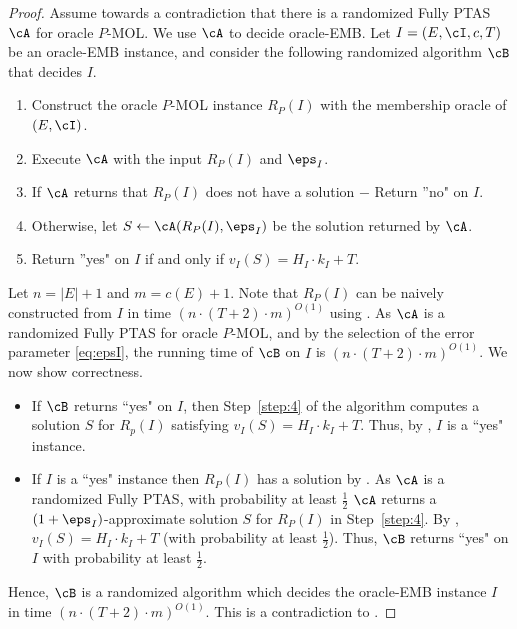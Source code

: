 \begin{proof}
	Assume towards a contradiction that there is a randomized Fully PTAS $\cA$ for oracle $P$-MOL. We use $\cA$ to decide oracle-EMB. Let $I = (E,\cI,c,T)$  be an oracle-EMB instance, and %
	consider the following randomized algorithm $\cB$ that decides $I$. 
	\begin{enumerate}
		\item Construct the oracle $P$-MOL instance $R_{P}(I)$
		with the membership oracle of $(E,\cI)$.\label{step:1} 
		\item 
		Execute $\cA$ with the input $R_{P}(I)$ and $\eps_I$. \label{step:2} 
		\item If $\cA$ returns that $R_{P}(I)$ does not have a solution $-$ Return ''no" on $I$. \label{step:3}  %
		\item Otherwise, let $S \leftarrow \cA(R_{P}(I),\eps_I)$ be the solution returned  by $\cA$.\label{step:4} 
		\item Return ''yes" on $I$ if and only if $v_I(S) = H_I \cdot k_I+T$. \label{step:5} 
	\end{enumerate}
	
	Let $n = |E|+1$ and $m = c(E)+1$. Note that $R_{P}(I)$ can be naively constructed from $I$ in time $\left(n \cdot (T+2) \cdot m\right)^{O(1)}$ using . 
	As $\cA$ is a randomized Fully PTAS for oracle $P$-MOL, and by the selection of the error parameter \eqref{eq:epsI}, the running time of $\cB$ on $I$ is $\left(n \cdot (T+2) \cdot m\right)^{O(1)}$. %
	We now show correctness. 
	\begin{itemize}
		\item If $\cB$ returns ``yes" on $I$, then Step~\ref{step:4} of the algorithm computes a solution $S$ for $R_p(I)$ satisfying $v_I(S) = H_I \cdot k_I+T$. Thus, by , $I$ is a ``yes" instance. %
		
		
		\item If $I$ is a ``yes" instance then $R_P(I)$ has a solution by .
		As $\cA$ is a randomized Fully PTAS, with probability at least $\frac{1}{2}$ $\cA$ returns a $(1+\eps_I)$-approximate solution $S$ for $R_P(I)$ in Step~\ref{step:4}. By , $v_I(S) = H_I \cdot k_I+T$ (with probability at least $\frac{1}{2}$). Thus, $\cB$ returns ``yes" on $I$ with probability at least $\frac{1}{2}$.
		\end{itemize}  Hence, $\cB$ is a randomized algorithm which decides the oracle-EMB instance $I$ in time \newline $\left(n \cdot (T+2) \cdot m\right)^{O(1)}$. This is a contradiction to .  
\end{proof}













